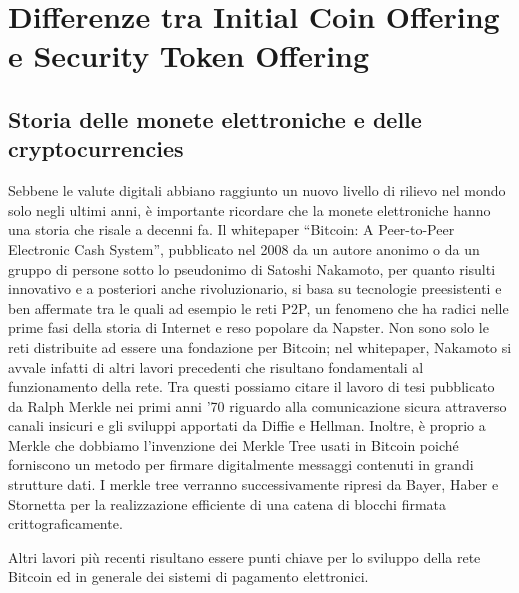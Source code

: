 \chapter{Differenze tra Initial Coin Offering e Security Token Offering}                %
\lhead[\fancyplain{}{\bfseries\thepage}]{\fancyplain{}{\bfseries\rightmark}}

\section{Storia delle monete elettroniche e delle cryptocurrencies}

Sebbene le valute digitali abbiano raggiunto un nuovo livello di rilievo nel mondo solo negli ultimi anni, è importante ricordare che la monete elettroniche hanno una storia che risale a decenni fa. Il whitepaper “Bitcoin: A Peer-to-Peer Electronic Cash System”\cite{K1}, pubblicato nel 2008 da un autore anonimo o da un gruppo di persone sotto lo pseudonimo di Satoshi Nakamoto, per quanto risulti innovativo e a posteriori anche rivoluzionario, si basa su tecnologie preesistenti e ben affermate tra le quali ad esempio le reti P2P, un fenomeno che ha radici nelle prime fasi della storia di Internet e reso popolare da Napster. Non sono solo le reti distribuite ad essere una fondazione per Bitcoin; nel whitepaper, Nakamoto si avvale infatti di altri lavori precedenti che risultano fondamentali al funzionamento della rete. Tra questi possiamo citare il lavoro di tesi pubblicato da Ralph Merkle nei primi anni ’70  riguardo alla comunicazione sicura attraverso canali insicuri e gli sviluppi apportati da Diffie e Hellman\cite{K2,k3}. Inoltre, è proprio a Merkle che dobbiamo l’invenzione dei Merkle Tree usati in Bitcoin poiché forniscono un metodo per firmare digitalmente messaggi contenuti in grandi strutture dati\cite{K4}. I merkle tree verranno successivamente ripresi da Bayer, Haber e Stornetta per la realizzazione efficiente di una catena di blocchi firmata crittograficamente\cite{K5}.


Altri lavori più recenti risultano essere punti chiave per lo sviluppo della rete Bitcoin ed in generale dei sistemi di pagamento elettronici.


